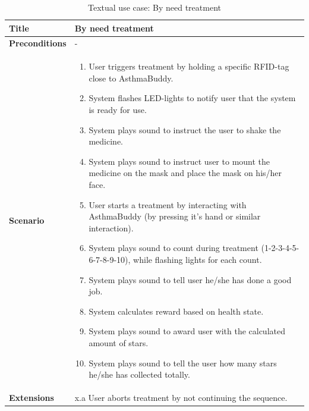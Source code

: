\begin{table}[H]
\begin{tabular}{|p{4.0cm} | p{9.0cm} |}
\hline
\textbf{Title} & By need treatment \\
\hline
\textbf{Preconditions} & - \\
\hline 
\textbf{Scenario} & 
	\begin{enumerate}
	  \itemsep0em
	  \item User triggers treatment by holding a specific RFID-tag close to AsthmaBuddy.
	  \item System flashes LED-lights to notify user that the system is ready for use.
	  \item System plays sound to instruct the user to shake the medicine.
	  \item System plays sound to instruct user to mount the medicine on the mask and place the mask on his/her face.
	  \item User starts a treatment by interacting with AsthmaBuddy (by pressing it's hand or similar interaction).
	  \item System plays sound to count during treatment (1-2-3-4-5-6-7-8-9-10), while flashing lights for each count.
	  \item System plays sound to tell user he/she has done a good job.
	  \item System calculates reward based on health state.
	  \item System plays sound to award user with the calculated amount of stars.
	  \item System plays sound to tell the user how many stars he/she has collected totally.
	\end{enumerate}
\\
\hline
	\textbf{Extensions} & 
		x.a User aborts treatment by not continuing the sequence.
\\
\hline
\end{tabular}
\caption{Textual use case: By need treatment}
\label{tab:textual-use-case}
\end{table}




